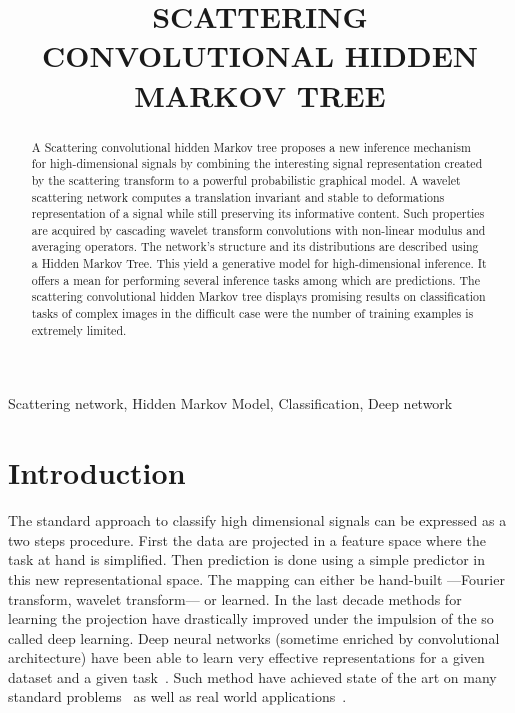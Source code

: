 \documentclass{article}
\title{SCATTERING CONVOLUTIONAL HIDDEN MARKOV TREE}
\begin{document}
%
\maketitle
%
\begin{abstract}
  A Scattering convolutional hidden Markov tree proposes a new inference mechanism for high-dimensional signals by combining the interesting signal representation created by the scattering transform to a powerful probabilistic graphical model.
  A wavelet scattering network computes a translation invariant and stable to deformations representation of a signal while still preserving its informative content. Such properties are acquired by cascading wavelet transform convolutions with non-linear modulus and averaging operators.
  The network's structure and its distributions are described using a Hidden Markov Tree. This yield a generative model for high-dimensional inference. It offers a mean for performing several inference tasks among which are predictions. The scattering convolutional hidden Markov tree displays promising results on classification tasks of complex images in the difficult case were the number of training examples is extremely limited.
\end{abstract}
%
\begin{keywords}
  Scattering network, Hidden Markov Model, Classification, Deep network
\end{keywords}
%
\section{Introduction}
  \label{sec:Intro}
  \vspace{-5pt}
  The standard approach to classify high dimensional signals can be expressed as a two steps procedure. First the data are projected in a feature space where the task at hand is simplified. Then prediction is done using a simple predictor in this new representational space. The mapping can either be hand-built ---\eg Fourier transform, wavelet transform--- or learned. In the last decade methods for learning the projection have drastically improved under the impulsion of the so called deep learning. Deep neural networks (sometime enriched by convolutional architecture) have been able to learn very effective representations for a given dataset and a given task~\cite{salakhutdinov2009deep, vincent2010stacked, lecun1995convolutional}. Such method have achieved state of the art on many standard problems~\cite{krizhevsky2012imagenet, hinton2012improving} as well as real world applications~\cite{huval2015empirical}. 
\end{document}
